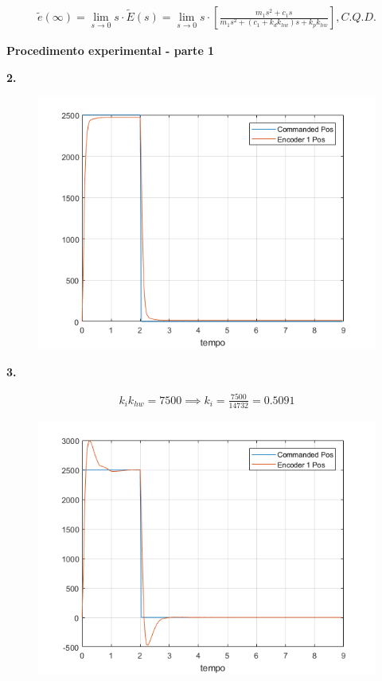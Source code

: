 \documentclass[a4paper,11pt]{article}
\begin{document}
\begin{gather*}
    \widetilde{e}\left(\infty\right) = \lim_{s \to 0} s \cdot
        \widetilde{E}\left(s\right) = \lim_{s \to 0} s \cdot
        \left[\frac{m_1 s^2 + c_1 s}{m_1 s^2 + \left(c_1 + k_d k_{hw}\right) s +
        k_p k_{hw}}\right], C.Q.D.
\end{gather*}

\textbf{Procedimento experimental - parte 1}

\textbf{2.}

\begin{figure}[H]
\includegraphics{q02}
\centering
\end{figure}

\pagebreak

\textbf{3.}

\begin{gather*}
    k_i k_{hw} = 7500 \implies k_i = \frac{7500}{14732} = 0.5091
\end{gather*}


\begin{figure}[H]
\includegraphics[scale=0.9]{q03}
\centering
\end{figure}
\end{document}
